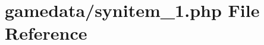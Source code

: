 \hypertarget{synitem__1_8php}{\section{gamedata/synitem\+\_\+1.php File Reference}
\label{synitem__1_8php}
}
